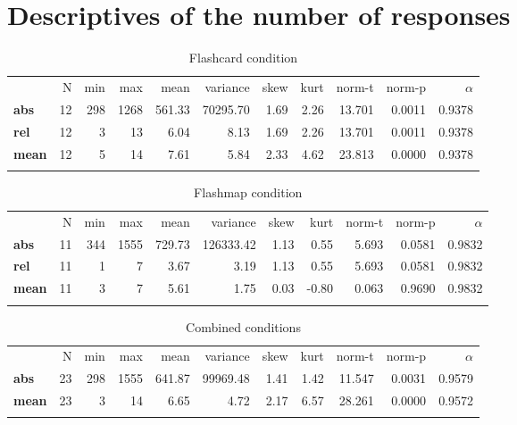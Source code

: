 \FloatBarrier
\section{Descriptives of the number of responses}

\begin{longtable}[c]{@{}lrrrrrrrrrr@{}}
\caption{Flashcard condition}
\endfirsthead
\endhead
\toprule\addlinespace
& N & min & max & mean & variance & skew & kurt & norm-t &
norm-p & $\alpha$
\\\addlinespace
\midrule
\textbf{abs} & 12 & 298 & 1268 & 561.33 & 70295.70 & 1.69 & 2.26 &
13.701 & 0.0011 & 0.9378
\\\addlinespace
\textbf{rel} & 12 & 3 & 13 & 6.04 & 8.13 & 1.69 & 2.26 & 13.701 & 0.0011
& 0.9378
\\\addlinespace
\textbf{mean} & 12 & 5 & 14 & 7.61 & 5.84 & 2.33 & 4.62 & 23.813 &
0.0000 & 0.9378
\\\addlinespace
\bottomrule
    \label{tab:responses_fc}
\end{longtable}

\begin{longtable}[c]{@{}lrrrrrrrrrr@{}}
\caption{Flashmap condition}
\endfirsthead
\toprule\addlinespace
& N & min & max & mean & variance & skew & kurt & norm-t &
norm-p & $\alpha$
\\\addlinespace
\midrule
\textbf{abs} & 11 & 344 & 1555 & 729.73 & 126333.42 & 1.13 & 0.55 &
5.693 & 0.0581 & 0.9832
\\\addlinespace
\textbf{rel} & 11 & 1 & 7 & 3.67 & 3.19 & 1.13 & 0.55 & 5.693 & 0.0581 &
0.9832
\\\addlinespace
\textbf{mean} & 11 & 3 & 7 & 5.61 & 1.75 & 0.03 & -0.80 & 0.063 & 0.9690
& 0.9832
\\\addlinespace
\bottomrule
    \label{tab:responses_fm}
\end{longtable}

\begin{longtable}[c]{@{}lrrrrrrrrrr@{}}
\caption{Combined conditions}
\endfirsthead
\toprule\addlinespace
& N & min & max & mean & variance & skew & kurt & norm-t &
norm-p & $\alpha$
\\\addlinespace
\midrule
\textbf{abs} & 23 & 298 & 1555 & 641.87 & 99969.48 & 1.41 & 1.42 &
11.547 & 0.0031 & 0.9579
\\\addlinespace
\textbf{mean} & 23 & 3 & 14 & 6.65 & 4.72 & 2.17 & 6.57 & 28.261 &
0.0000 & 0.9572
\\\addlinespace
\bottomrule
    \label{tab:responses_gen}
\end{longtable}

